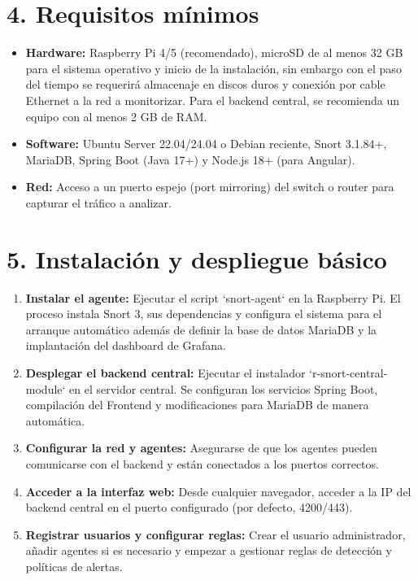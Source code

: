 \documentclass[11pt,a4paper,twoside]{report}
\begin{document}
\section*{4. Requisitos mínimos}

\begin{itemize}
	\item \textbf{Hardware:} Raspberry Pi 4/5 (recomendado), microSD de al menos 32 GB para el sistema operativo y inicio de la instalación, sin embargo con el paso del tiempo se requerirá almacenaje en discos duros y conexión por cable Ethernet a la red a monitorizar. Para el backend central, se recomienda un equipo con al menos 2 GB de RAM.
	\item \textbf{Software:} Ubuntu Server 22.04/24.04 o Debian reciente, Snort 3.1.84+, MariaDB, Spring Boot (Java 17+) y Node.js 18+ (para Angular).
	\item \textbf{Red:} Acceso a un puerto espejo (port mirroring) del switch o router para capturar el tráfico a analizar.
\end{itemize}

\section*{5. Instalación y despliegue básico}

\begin{enumerate}
	\item \textbf{Instalar el agente:} Ejecutar el script `snort-agent` en la Raspberry Pi. El proceso instala Snort 3, sus dependencias y configura el sistema para el arranque automático además de definir la base de datos MariaDB y la implantación del dashboard de Grafana.
	\item \textbf{Desplegar el backend central:} Ejecutar el instalador `r-snort-central-module` en el servidor central. Se configuran los servicios Spring Boot, compilación del Frontend y modificaciones para MariaDB de manera automática.
	\item \textbf{Configurar la red y agentes:} Asegurarse de que los agentes pueden comunicarse con el backend y están conectados a los puertos correctos.
	\item \textbf{Acceder a la interfaz web:} Desde cualquier navegador, acceder a la IP del backend central en el puerto configurado (por defecto, 4200/443).
	\item \textbf{Registrar usuarios y configurar reglas:} Crear el usuario administrador, añadir agentes si es necesario y empezar a gestionar reglas de detección y políticas de alertas.
\end{enumerate}
\end{document}
